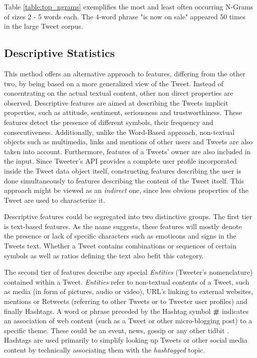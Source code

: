 		Table \ref{table:top_ngrams} exemplifies the most and least often occurring N-Grams of sizes 2 - 5 words each. The 4-word phrase "is now on sale" appeared 50 times in the large Tweet corpus.
	
	\subsection{Descriptive Statistics}
		\label{section:Descriptive_Features}
		This method offers an alternative approach to features, differing from the other two, by being based on a more generalized view of the Tweet. Instead of concentrating on the actual textual content, other non direct properties are observed. Descriptive features are aimed at describing the Tweets implicit properties, such as attitude, sentiment, seriousness and trustworthiness. These features detect the presence of different symbols, their frequency and consecutiveness. Additionally, unlike the Word-Based approach, non-textual objects such as multimedia, links and mentions of other users and Tweets are also taken into account. Furthermore, features of a Tweets' owner are also included in the input. Since Tweeter's API provides a complete user profile incorporated inside the Tweet data object itself, constructing features describing the user is done simultaneously to features describing the content of the Tweet itself. This approach might be viewed as an \textit{indirect} one, since less obvious properties of the Tweet are used to characterize it.
		\par
		Descriptive features could be segregated into two distinctive groups. The first tier is text-based features. As the name suggests, these features will mostly denote the presence or lack of specific characters such as emoticons and signs in the Tweets text. Whether a Tweet contains combinations or sequences of certain symbols as well as ratios defining the text also befit this category.
		\par
		The second tier of features describe any special \textit{Entities} (Tweeter's nomenclature) contained within a Tweet. \textit{Entities} refer to non-textual contents of a Tweet, such as media (in form of pictures, audio or video), URL's linking to external websites, mentions or Retweets (referring to other Tweets or to Tweeter user profiles) and finally Hashtags. A word or phrase preceded by the Hashtag symbol \textbf{\#} indicates an association of web content (such as a Tweet or other micro-blogging post) to a specific theme. These could be an event, news, gossip or any other tidbit \cite{dict_Tweet}. Hashtags are used primarily to simplify looking up Tweets or other social media content by technically associating them with the \textit{hashtagged} topic.
		

